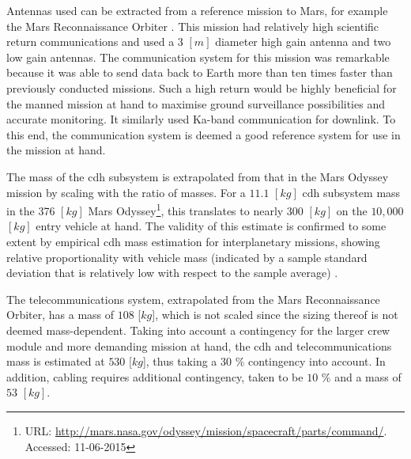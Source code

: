Antennas used can be extracted from a reference mission to Mars, for example the Mars Reconnaissance Orbiter \cite{Taylor2006}. This mission had relatively high scientific return communications and used a $3$ $[m]$ diameter high gain antenna and two low gain antennas. The communication system for this mission was remarkable because it was able to send data back to Earth more than ten times faster than previously conducted missions. Such a high return would be highly beneficial for the manned mission at hand to maximise ground surveillance possibilities and accurate monitoring. It similarly used Ka-band communication for downlink. To this end, the communication system is deemed a good reference system for use in the mission at hand.

The mass of the \gls{cdh} subsystem is extrapolated from that in the Mars Odyssey mission by scaling with the ratio of masses. For a $11.1$ $[kg]$ \gls{cdh} subsystem mass in the 376 $[kg]$ Mars Odyssey\footnote{URL: \url{http://mars.nasa.gov/odyssey/mission/spacecraft/parts/command/}. Accessed: 11-06-2015}, this translates to nearly $300$ $[kg]$ on the $10,000$ $[kg]$ entry vehicle at hand. The validity of this estimate is confirmed to some extent by empirical \gls{cdh} mass estimation for interplanetary missions, showing relative proportionality with vehicle mass (indicated by a sample standard deviation that is relatively low with respect to the sample average) \cite[p.953]{Wertz2011}.

The telecommunications system, extrapolated from the Mars Reconnaissance Orbiter, has a mass of $108$ [$kg$], which is not scaled since the sizing thereof is not deemed mass-dependent. Taking into account a contingency for the larger crew module and more demanding mission at hand, the \gls{cdh} and telecommunications mass is estimated at $530$ [$kg$], thus taking a $30$ $\%$ contingency into account. In addition, cabling requires additional contingency, taken to be $10$ $\%$ and a mass of $53$ $[kg]$.
